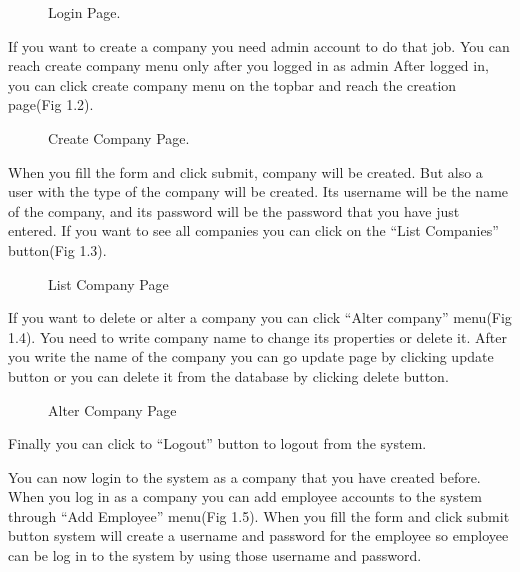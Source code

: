 \documentclass[a4paper,10pt,english]{sphinxmanual}
\begin{document}
\begin{figure}[htbp]
\centering
\capstart

\noindent{}
\caption{Login Page.}\label{\detokenize{user/member1:id1}}\end{figure}

If you want to create a company you need admin account to do that job. You can reach create company menu only after you logged in as admin
After logged in, you can click create company menu on the topbar and reach the creation page(Fig 1.2).

\begin{figure}[htbp]
\centering
\capstart

\noindent{}
\caption{Create Company Page.}\label{\detokenize{user/member1:id2}}\end{figure}

When you fill the form and click submit, company will be created. But also a user with the type of the company will be created.
Its username will be the name of the company, and its password will be the password that you have just entered. If you want to see
all companies you can click on the “List Companies” button(Fig 1.3).

\begin{figure}[htbp]
\centering
\capstart

\noindent{}
\caption{List Company Page}\label{\detokenize{user/member1:id3}}\end{figure}

If you want to delete or alter a company you can click “Alter company” menu(Fig 1.4). You need to write company name to change
its properties or delete it. After you write the name of the company you can go update page by clicking update button or you can
delete it from the database by clicking delete button.

\begin{figure}[htbp]
\centering
\capstart

\noindent{}
\caption{Alter Company Page}\label{\detokenize{user/member1:id4}}\end{figure}

Finally you can click to “Logout” button to logout from the system.

You can now login to the system as a company that you have created before.
When you log in as a company you can add employee accounts to the system through “Add Employee” menu(Fig 1.5). When you fill the form and
click submit button system will create a username and password for the employee so employee can be log in to the system by using
those username and password.
\end{document}
